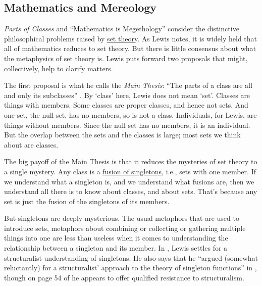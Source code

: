 \subsection{Mathematics and Mereology} 
\textit{Parts of Classes} \citeyearpar{Lewis1991a} and ``Mathematics is Megethology'' \citeyearpar{Lewis1993d} consider the distinctive philosophical problems raised by \href{http://plato.stanford.edu/set-theory/}{set theory}. As Lewis notes, it is widely held that all of mathematics reduces to set theory. But there is little consensus about what the metaphysics of set theory is. Lewis puts forward two proposals that might, collectively, help to clarify matters.

The first proposal is what he calls the \textit{Main Thesis}: ``The parts of a class are all and only its subclasses'' \citeyearpar[7]{Lewis1991a}. By `class' here, Lewis does not mean `set'. Classes are things with members. Some classes are proper classes, and hence not sets. And one set, the null set, has no members, so is not a class. Individuals, for Lewis, are things without members. Since the null set has no members, it is an individual. But the overlap between the sets and the classes is large; most sets we think about are classes.

The big payoff of the Main Thesis is that it reduces the mysteries of set theory to a single mystery. Any class is a \href{http://plato.stanford.edu/mereology/index.html#DecPri}{fusion of singletons}, i.e., sets with one member. If we understand what a singleton is, and we understand what fusions are, then we understand all there is to know about classes, and about sets. That's because any set is just the fusion of the singletons of its members.

But singletons are deeply mysterious. The usual metaphors that are used to introduce sets, metaphors about combining or collecting or gathering multiple things into one are less than useless when it comes to understanding the relationship between a singleton and its member. In \citeyearpar{Lewis1993d}, Lewis settles for a structuralist understanding of singletons. He also says that he ``argued (somewhat reluctantly) for a structuralist' approach to the theory of singleton functions'' in \citeyearpar{Lewis1991a}, though on page 54 of \citeyearpar{Lewis1991a} he appears to offer qualified resistance to structuralism.

